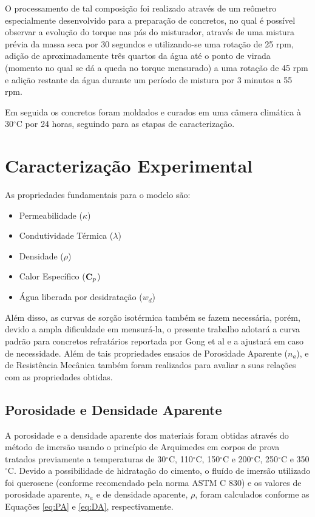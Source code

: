 O processamento de tal composição foi realizado através de um reômetro
especialmente desenvolvido para a preparação de concretos, no qual é possível
observar a evolução do torque nas pás do misturador, através de uma mistura
prévia da massa seca por 30 segundos e utilizando-se uma rotação de 25 rpm,
adição de aproximadamente três quartos da água até o ponto de virada (momento no
qual se dá a queda no torque mensurado) a uma rotação de 45 rpm  e adição
restante da água durante um período de mistura por 3  minutos a 55 rpm.

Em seguida os concretos foram moldados e curados em uma câmera climática à
30$^{\circ}$C por 24 horas, seguindo para as etapas de caracterização.

\section{Caracterização Experimental}\label{mat:exp}
As propriedades fundamentais para o modelo são:

\begin{itemize}
\item Permeabilidade ($\kappa$)
\item Condutividade Térmica ($\lambda$)
\item Densidade ($\rho$)
\item Calor Específico ($\bm{\mathrm{C}}_p$)
\item Água liberada por desidratação ($w_d$)
\end{itemize}

Além disso, as curvas de sorção isotérmica também se fazem necessária, porém,
devido a ampla dificuldade em mensurá-la, o presente trabalho adotará a curva
padrão para concretos refratários reportada por Gong et al\cite{Gong1995a} e a
ajustará em caso de necessidade. Além de tais propriedades ensaios de Porosidade
Aparente ($n_a$), e de Resistência Mecânica também foram realizados para avaliar
a suas relações com as propriedades obtidas.

\subsection{Porosidade e Densidade Aparente}\label{mat:porosidade}
A porosidade e a densidade aparente dos materiais foram obtidas através do
método de imersão usando o princípio de Arquimedes em corpos de prova tratados
previamente a temperaturas de 30$^\circ$C, 110$^\circ$C, 150$^\circ$C e
200$^\circ$C, 250$^\circ$C e 350$^\circ$C. Devido a possibilidade de hidratação
do cimento, o fluído de imersão utilizado foi querosene (conforme recomendado
pela norma ASTM C 830) e os valores de porosidade aparente, $n_a$ e de densidade
aparente, $\rho$, foram calculados conforme as Equações \ref{eq:PA} e
\ref{eq:DA}, respectivamente.

